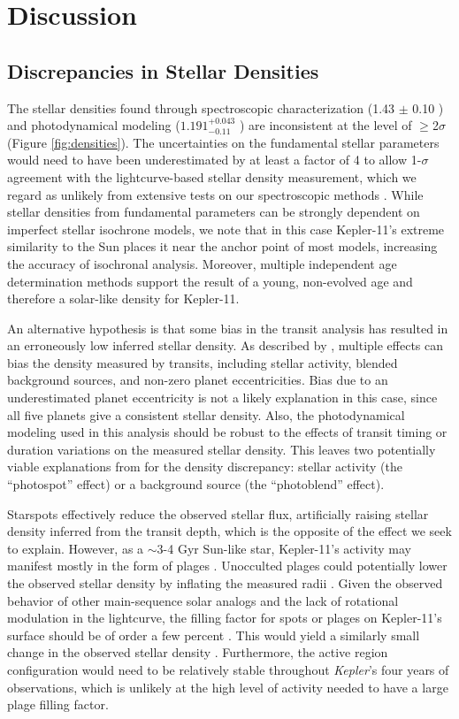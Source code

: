 \documentclass[oneside]{emulateapj}
\begin{document}
\section{Discussion}
\label{s:discussion}
\subsection{Discrepancies in Stellar Densities}

The stellar densities found through spectroscopic characterization (1.43 $\pm$ 0.10 \gcm) and photodynamical modeling ($1.191^{+0.043}_{-0.11} $ \gcm) are inconsistent at the level of $\geq$2$\sigma$ (Figure \ref{fig:densities}). The uncertainties on the fundamental stellar parameters would need to have been underestimated by at least a factor of 4 to allow 1-$\sigma$ agreement with the lightcurve-based stellar density measurement, which we regard as unlikely from extensive tests on our spectroscopic methods \citep{Bedell2014,Ramirez2014}. While stellar densities from fundamental parameters can be strongly dependent on imperfect stellar isochrone models, we note that in this case Kepler-11's extreme similarity to the Sun places it near the anchor point of most models, increasing the accuracy of isochronal analysis. Moreover, multiple independent age determination methods support the result of a young, non-evolved age and therefore a solar-like density for Kepler-11.

An alternative hypothesis is that some bias in the transit analysis has resulted in an erroneously low inferred stellar density. As described by \citet{Kipping2014}, multiple effects can bias the density measured by transits, including stellar activity, blended background sources, and non-zero planet eccentricities. Bias due to an underestimated planet eccentricity is not a likely explanation in this case, since all five planets give a consistent stellar density. Also, the photodynamical modeling used in this analysis should be robust to the effects of transit timing or duration variations on the measured stellar density. This leaves two potentially viable explanations from \citet{Kipping2014} for the density discrepancy: stellar activity (the ``photospot'' effect) or a background source (the ``photoblend'' effect).

Starspots effectively reduce the observed stellar flux, artificially raising stellar density inferred from the transit depth, which is the opposite of the effect we seek to explain. However, as a $\sim$3-4 Gyr Sun-like star, Kepler-11's activity may manifest mostly in the form of plages \citep{Radick1998}. Unocculted plages could potentially lower the observed stellar density by inflating the measured radii \citep{Oshagh2014}. Given the observed behavior of other main-sequence solar analogs and the lack of rotational modulation in the \Kepler lightcurve, the filling factor for spots or plages on Kepler-11's surface should be of order a few percent \citep{Meunier2010}. This would yield a similarly small change in the observed stellar density \citep{Kipping2014}. Furthermore, the active region configuration would need to be relatively stable throughout \textit{Kepler}'s four years of observations, which is unlikely at the high level of activity needed to have a large plage filling factor.
\end{document}
